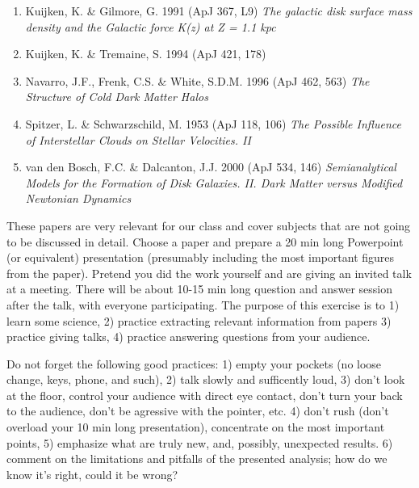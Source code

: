 \documentclass[10pt]{article}
\begin{document}
\begin{enumerate}
\item Kuijken, K. \& Gilmore, G. 1991 (ApJ 367, L9)  
     {\it The galactic disk surface mass density and the Galactic force K(z) at Z = 1.1 kpc}
\item Kuijken, K. \& Tremaine, S. 1994 (ApJ 421, 178)
\item Navarro, J.F., Frenk, C.S. \& White, S.D.M. 1996 (ApJ 462, 563) 
         {\it The Structure of Cold Dark Matter Halos}              
\item Spitzer, L. \& Schwarzschild, M. 1953 (ApJ 118, 106) 
           {\it The Possible Influence of Interstellar Clouds on Stellar Velocities. II}
\item van den Bosch, F.C. \& Dalcanton, J.J. 2000 (ApJ 534, 146)
         {\it Semianalytical Models for the Formation of 
               Disk Galaxies. II. Dark Matter versus Modified Newtonian Dynamics}
\end{enumerate}

These papers are very relevant for our class and cover subjects that are
not going to be discussed in detail. Choose a paper and prepare a 20 min long 
Powerpoint (or equivalent) presentation
(presumably including the most important figures from the paper). Pretend 
you did the work yourself and are giving an invited talk at a meeting. 
There will be about 10-15 min long question and answer session after the talk,
with everyone participating. 
The purpose of this exercise is to 1) learn some science, 2) practice 
extracting relevant information from papers 3) practice giving talks,
4) practice answering questions from your audience.

Do not forget the following good practices: 
1) empty your pockets (no loose change, keys, phone, and such),
2) talk slowly and sufficently loud, 3) don't look at the floor, control
your audience with direct eye contact, don't turn your back to the audience, 
don't be agressive with the pointer, etc. 4) don't rush (don't overload 
your 10 min long presentation), concentrate on the most important points,
5) emphasize what are truly new, and, possibly, unexpected results.
6) comment on the limitations and pitfalls of the presented analysis;
how do we know it's right, could it be wrong?
\end{document}
